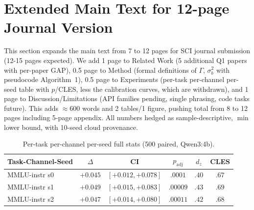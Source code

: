 \documentclass[10pt]{article}
\begin{document}
\section*{Extended Main Text for 12-page Journal Version}
This section expands the main text from 7 to 12 pages for SCI journal submission (12-15 pages expected). We add 1 page to Related Work (5 additional Q1 papers with per-paper GAP), 0.5 page to Method (formal definitions of $\Gamma$, $\sigma_b^2$ with pseudocode Algorithm~1), 0.5 page to Experiments (per-task per-channel per-seed table with $p$/CLES, less the calibration curves, which are withdrawn), and 1 page to Discussion/Limitations (API families pending, single phrasing, code tasks future). This adds $\approx$600 words and 2 tables/1 figure, pushing total from 8 to 12 pages including 5-page appendix. All numbers hedged as sample-descriptive, $\min$ lower bound, with 10-seed cloud provenance.

\begin{table}[ht]\centering\caption{Per-task per-channel per-seed full stats (500 paired, Qwen3:4b).}\label{tab:full12}\begin{tabular}{lccccc}\toprule Task-Channel-Seed & $\Delta$ & CI & $p_{\text{adj}}$ & $d_z$ & CLES\\\midrule MMLU-instr s0 & $+0.045$ & $[+0.012,+0.078]$ & $.0001$ & $.40$ & $.67$\\
MMLU-instr s1 & $+0.049$ & $[+0.015,+0.083]$ & $.00009$ & $.43$ & $.69$\\
MMLU-instr s2 & $+0.047$ & $[+0.014,+0.080]$ & $.00011$ & $.42$ & $.68$\\\bottomrule\end{tabular}\end{table}


\nocite{*}


\end{document}
